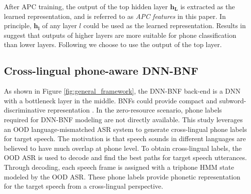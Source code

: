 \documentclass[a4paper]{article}
\begin{document}
After APC training, the output of the top hidden layer $\bm{h_L}$ is extracted as the  learned  representation, and is referred to as \textit{APC features} in this paper. In principle,  $\bm{h_l}$ of any layer $l$ could be used as the learned representation. Results in \cite{Chung2019} suggest that outputs of higher layers  are more suitable for phone classification than lower layers. Following \cite{Chung2019} we choose to use the output of the top layer.

\subsection{Cross-lingual phone-aware DNN-BNF}
As shown in Figure \ref{fig:general_framework}, the DNN-BNF back-end
is a DNN with a bottleneck   layer in the middle. BNFs could provide compact and subword-discriminative representation  \cite{grezl2009investigation}.  
In the zero-resource scenario, phone labels  required for DNN-BNF modeling are not directly available.
This study leverages an OOD language-mismatched ASR system to generate cross-lingual phone labels for target  speech.
{\color{blue}The motivation  is that
speech sounds in different languages are believed to have much overlap at phone level.}
To obtain cross-lingual labels, the OOD ASR is used to decode  and find the best paths for  target speech utterances. Through decoding, each speech frame is assigned with a triphone HMM state modeled by the OOD ASR. These phone labels provide phonetic representation for the target speech from a cross-lingual perspective. 
\end{document}
